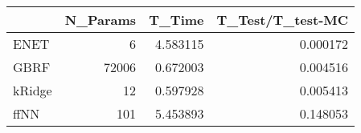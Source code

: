 \begin{tabular}{lrrr}
\toprule
{} &  N\_Params &    T\_Time &  T\_Test/T\_test-MC \\
\midrule
ENET   &         6 &  4.583115 &          0.000172 \\
GBRF   &     72006 &  0.672003 &          0.004516 \\
kRidge &        12 &  0.597928 &          0.005413 \\
ffNN   &       101 &  5.453893 &          0.148053 \\
\bottomrule
\end{tabular}
